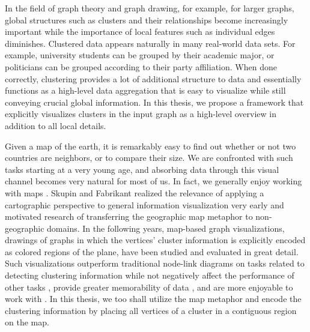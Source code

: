 \label{sect:motivation}

In the field of graph theory and graph drawing, for example, for larger graphs, global structures such as clusters and their relationships become increasingly important while the importance of local features such as  individual edges diminishes.
Clustered data appears naturally in many real-world data sets.
For example, university students can be grouped by their academic major, or politicians can be grouped according to their party affiliation.
When done correctly, clustering provides a lot of additional structure to data and essentially functions as a high-level data aggregation that is easy to visualize while still conveying crucial global information.
In this thesis, we propose a framework that explicitly visualizes clusters in the input graph as a high-level overview in addition to all local details.

Given a map of the earth, it is remarkably easy to find out whether or not two countries are neighbors, or to compare their size.
We are confronted with such tasks starting at a very young age, and absorbing data through this visual channel becomes very natural for most of us.
In fact, we generally enjoy working with maps \cite{saket2016comparing}.
Skupin and Fabrikant \cite{skupin2003spatialization} realized the relevance of applying a cartographic perspective to general information visualization very early and motivated research of transferring the geographic map metaphor to non-geographic domains.
In the following years, map-based graph visualizations, \ie{} drawings of graphs in which the vertices' cluster information is explicitly encoded as colored regions of the plane, have been studied and evaluated in great detail.
Such visualizations outperform traditional node-link diagrams on tasks related to detecting clustering information while not negatively affect the performance of other tasks \cite{saket2014node}, provide greater memorability of data \cite{saket2015map}, and are more enjoyable to work with \cite{saket2016comparing}.
In this thesis, we too shall utilize the map metaphor and encode the clustering information by placing all vertices of a cluster in a contiguous region on the map.

